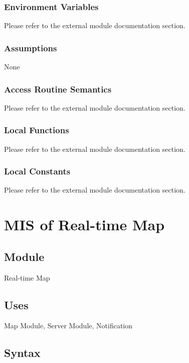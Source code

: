 \documentclass[12pt, titlepage]{article}
\begin{document}
\subsubsection{Environment Variables}

Please refer to the external module documentation section.

\subsubsection{Assumptions}

None

\subsubsection{Access Routine Semantics}

Please refer to the external module documentation section.

\subsubsection{Local Functions}

Please refer to the external module documentation section.

\subsubsection{Local Constants}

Please refer to the external module documentation section.
 
\newpage

\section{MIS of Real-time Map} \label{mRealTimeMap}

\subsection{Module}

Real-time Map

\subsection{Uses}

Map Module, Server Module, Notification

\subsection{Syntax}
\end{document}
